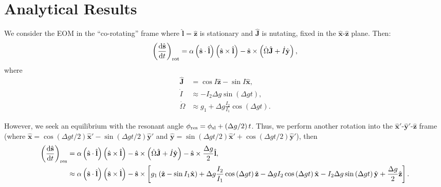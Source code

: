 \documentclass[11pt,
        usenames, %
        dvipsnames %
    ]{article}
\newcommand*{\rd}[2]{\frac{\mathrm{d}#1}{\mathrm{d}#2}}
\newcommand*{\bm}[1]{\boldsymbol{\mathbf{#1}}}
\newcommand*{\uv}[1]{\hat{\bm{#1}}}
\newcommand*{\p}[1]{\left(#1\right)}
\newcommand*{\s}[1]{\left[#1\right]}
\begin{document}
\section{Analytical Results}

We consider the EOM in the ``co-rotating'' frame where $\uv{l} = \uv{z}$ is
stationary and $\uv{J}$ is nutating, fixed in the $\uv{x}$-$\uv{z}$ plane. Then:
\begin{equation}
    \p{\rd{\uv{s}}{t}}_{\rm rot} = \alpha\p{\uv{s} \cdot \uv{l}} \p{\uv{s}
        \times \uv{l}} - \uv{s} \times \p{\dot{\Omega} \uv{J} + \dot{I}\uv{y}},
\end{equation}
where
\begin{align}
    \uv{J} &= \cos I \uv{z} - \sin I \uv{x},\\
    \dot{I} &\approx -I_2 \Delta g \sin\p{\Delta g t},\\
    \dot{\Omega} &\approx g_1 + \Delta g \frac{I_2}{I_1}\cos\p{\Delta g t}.
\end{align}

However, we seek an equilibrium with the resonant angle $\phi_{\rm res} =
\phi_{\rm sl} + \p{\Delta g / 2}t$. Thus, we perform another rotation into the
$\uv{x}'$-$\uv{y}'$-$\uv{z}$ frame (where $\uv{x} = \cos\p{\Delta g t /
2}\uv{x}' - \sin\p{\Delta g t / 2}\uv{y}'$ and $\uv{y} = \sin\p{\Delta g t /
2}\uv{x}' + \cos\p{\Delta g t / 2}\uv{y}'$), then
{\small
\begin{align}
    \p{\rd{\uv{s}}{t}}_{\rm res} &= \alpha\p{\uv{s} \cdot \uv{l}} \p{\uv{s}
            \times \uv{l}} - \uv{s} \times \p{\dot{\Omega} \uv{J} +
            \dot{I}\uv{y}} - \uv{s} \times \frac{\Delta g}{2}\uv{l},\\
        &\approx \alpha\p{\uv{s} \cdot \uv{l}} \p{\uv{s} \times \uv{l}}
            - \uv{s} \times \s{
                g_1\p{\uv{z} - \sin I_1 \uv{x}}
                + \Delta g \frac{I_2}{I_1}\cos\p{\Delta g t}\uv{z}
                - \Delta g I_2\cos\p{\Delta g t}\uv{x}
                - I_2 \Delta g \sin \p{\Delta g t}\uv{y}
                + \frac{\Delta g}{2}\uv{z}}.
\end{align}}
\end{document}
